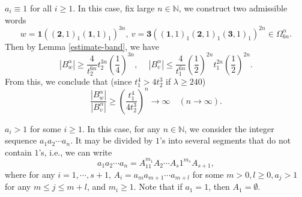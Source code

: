 \documentclass[reqno,11pt,graphicx,]{amsart}
\numberwithin{equation}{section}
\theoremstyle{plain}
\newcommand{\N}{{\mathbb N}}
\newcommand{\3}{\mathbf{3}}
\begin{document}
	\medskip
	 $a_i\equiv1$ for all $i\geq1$. In this case, fix large $n\in\N$, we construct two admissible words
	\begin{equation*}
		w=\mathbf{1}((\mathbf{2},1)_{1}(\mathbf{1},1)_1)^{3n},\ v=\mathbf{3}((\mathbf{1},1)_{1}(\mathbf{2},1)_1(\mathbf{3},1)_1)^{2n}\in\Omega^{\alpha}_{6n}.
	\end{equation*}
	Then by Lemma \ref{estimate-band}, we have 
	\begin{equation*}
		|B^{\alpha}_{w}|\geq\frac{4}{t_2^{6n}}t_2^{3n}\left(\frac{1}{4}\right)^{3n},\quad\ |B^{\alpha}_{v}|\leq\frac{4}{t_1^{6n}}\left(\frac{1}{2}\right)^{2n}
t_1^{2n}\left(\frac{1}{2}\right)^{2n}.
	\end{equation*}
	From this, we conclude that (since $t_1^4>4t_2^3$ if $\lambda\geq240$)
	\begin{equation*}
		\frac{|B^{\alpha}_{w}|}{|B^{\alpha}_{v}|}\geq
\left(\frac{t_1^4}{4t_2^3}\right)^{n}\to\infty\quad(n\to\infty).
	\end{equation*}
	
	\medskip
	 $a_i>1$ for some $i\geq1$. In this case, for any $n\in\N$, we consider the integer sequence $a_1a_2\cdots a_n$. It may be divided by $1$'s into
	several segments that do not contain $1$'s,	i.e., we can write
	\begin{equation}
		a_1a_2\cdots a_n=A_11^{m_1}A_2\cdots A_s1^{m_s}A_{s+1}, \label{es7}
	\end{equation}
	where for any $i=1,\cdots, s+1$, $A_i=a_ma_{m+1}\cdots a_{m+l}$ for some $m>0,l\geq0,a_j>1$ for any $m\leq j\leq m+l$, and $m_i\geq1$. Note that if $a_1=1$, then $A_1=\emptyset$. 
	
\end{document}
